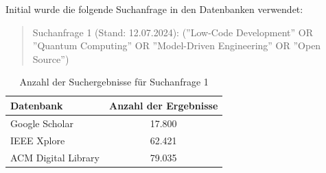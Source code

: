 
Initial wurde die folgende Suchanfrage in den Datenbanken verwendet:

\begin{quote}
    Suchanfrage 1 (Stand: 12.07.2024):
    (''Low-Code Development'' OR ''Quantum Computing'' OR ''Model-Driven Engineering'' OR ''Open Source'')
\end{quote}

\begin{table}[h!]
    \centering
    \caption{Anzahl der Suchergebnisse für Suchanfrage 1}
    \label{tab:search_1_results}
    \begin{tabular}{|l|c|}
    \hline
    \textbf{Datenbank} & \textbf{Anzahl der Ergebnisse} \\ \hline
    Google Scholar & 17.800 \\ \hline
    IEEE Xplore & 62.421 \\ \hline
    ACM Digital Library & 79.035 \\ \hline
    \end{tabular}
\end{table}
    

